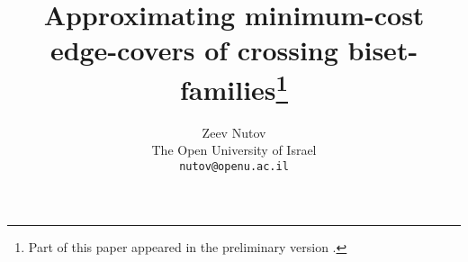 
\setlength{\textheight}{8.8in}
\setlength{\textwidth}{6.5in}
\setlength{\evensidemargin}{-0.18in}
\setlength{\oddsidemargin}{-0.18in}
\setlength{\headheight}{0in}
\setlength{\headsep}{10pt}
\setlength{\topsep}{0in}
\setlength{\topmargin}{0.0in}
\setlength{\itemsep}{0in}      \renewcommand{\baselinestretch}{1.2}
\parskip=0.080in

\newcommand {\ignore} [1] {}

\newtheorem{theorem}{Theorem}[section]
\newtheorem{lemma}[theorem]{Lemma}
\newtheorem{fact}[theorem]{Fact}
\newtheorem{corollary}[theorem]{Corollary}
\newtheorem{definition}{Definition}[section]
\newtheorem{proposition}[theorem]{Proposition}
\newtheorem{observation}[theorem]{Observation}
\newtheorem{claim}[theorem]{Claim}
\newtheorem{assumption}[theorem]{Assumption}
\newtheorem{notation}[theorem]{Notation}
\newenvironment{proof}{\noindent{\bf Proof:\/}}{\hfill $\Box$\vskip 0.1in}
\newenvironment{proofsp}{\noindent{\bf Proof}}{\hfill $\Box$\vskip 0.1in}



\date{}

\title{Approximating minimum-cost edge-covers of crossing biset-families\thanks{Part of this paper 
appeared in the preliminary version \cite{N}.}}

\author{
Zeev Nutov \\
\small The Open University of Israel \\
\small {\tt nutov@openu.ac.il}
}

\maketitle

